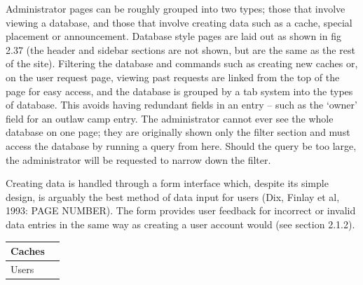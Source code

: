 Administrator pages can be roughly grouped into two types; those that involve viewing a database, and those that involve creating data such as a cache, special placement or announcement. Database style pages are laid out as shown in fig 2.37 (the header and sidebar sections are not shown, but are the same as the rest of the site). Filtering the database and commands such as creating new caches or, on the user request page, viewing past requests are linked from the top of the page for easy access, and the database is grouped by a tab system into the types of database. This avoids having redundant fields in an entry – such as the ‘owner’ field for an outlaw camp entry. The administrator cannot ever see the whole database on one page; they are originally shown only the filter section and must access the database by running a query from here. Should the query be too large, the administrator will be requested to narrow down the filter.

Creating data is handled through a form interface which, despite its simple design, is arguably the best method of data input for users (Dix, Finlay et al, 1993: PAGE NUMBER). The form provides user feedback for incorrect or invalid data entries in the same way as creating a user account would (see section 2.1.2).



\begin{tabular}{| p{} | p{} |}
	\hline
	Caches &
	\lipsum[1] \\
	\hline
	Users &
	\lipsum[2] \\
	\hline
\end{tabular}
